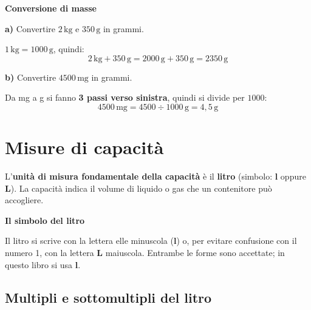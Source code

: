 \begin{esempio}
    \textbf{Conversione di masse}

    \medskip
    \textbf{a)} Convertire $2\,\text{kg}$ e $350\,\text{g}$ in grammi.

    $1\,\text{kg} = 1000\,\text{g}$, quindi:
    \[
        2\,\text{kg} + 350\,\text{g} = 2000\,\text{g} + 350\,\text{g} = 2350\,\text{g}
    \]

    \medskip
    \textbf{b)} Convertire $4500\,\text{mg}$ in grammi.

    Da mg a g si fanno \textbf{3 passi verso sinistra}, quindi si divide per $1000$:
    \[
        4500\,\text{mg} = 4500 \div 1000\,\text{g} = 4{,}5\,\text{g}
    \]
\end{esempio}

\section{Misure di capacità}

\begin{definizione}
    L'\textbf{unità di misura fondamentale della capacità} è il \textbf{litro} (simbolo: \textbf{l} oppure \textbf{L}). La capacità indica il volume di liquido o gas che un contenitore può accogliere.
\end{definizione}

\begin{attenzione}
    \textbf{Il simbolo del litro}

    Il litro si scrive con la lettera elle minuscola (\textbf{l}) o, per evitare confusione con il numero 1, con la lettera \textbf{L} maiuscola. Entrambe le forme sono accettate; in questo libro si usa \textbf{l}.
\end{attenzione}

\subsection{Multipli e sottomultipli del litro}

